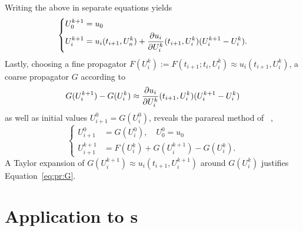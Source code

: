 Writing the above in separate equations yields
\begin{equation}
  \left\{
  \begin{aligned}
    U^{k+1}_0 &= u_0 \\
    U^{k+1}_i &= u_i(t_{i+1}, U^k_n) + \pdiff{U^k_i}{u_i}(t_{i+1}, U^k_i) (U^{k+1}_i - U^k_i).
  \end{aligned}
  \right.
\end{equation}
Lastly, choosing a fine propagator $F(U^k_i) := F(t_{i+1}; t_i, U^k_i) \approx u_i(t_{i+1}, U^k_i)$,
a coarse propagator $G$ according to
\begin{equation}
  \label{eq:pr:G}
  G(U^{k+1}_i) - G(U^k_i)
  \approx
  \pdiff{U^k_i}{u_i}(t_{i+1}, U^k_i) (U^{k+1}_i - U^k_i)
\end{equation}
as well as initial values $ U^0_{i+1} = G(U^0_i) $,
reveals the parareal method of \citeauthor{Baffico2002}~\cite{Baffico2002},
\begin{equation}
  \left\{
  \begin{aligned}
    U^0_{i+1} &= G(U^0_i),
    \quad
    U^0_0 = u_0 \\
    U^{k+1}_{i+1} &= F(U^k_i) + G(U^{k+1}_i) - G(U^k_i)
    .
  \end{aligned}
  \right.
\end{equation}
A Taylor expansion of $G(U^{k+1}_i) \approx u_i(t_{i+1}, U^{k+1}_i)$ around $G(U^k_i)$ justifies Equation~\eqref{eq:pr:G}.

\section{Application to \texorpdfstring{s}{LRSIFs}}
\label{sec:pr:DRE}

